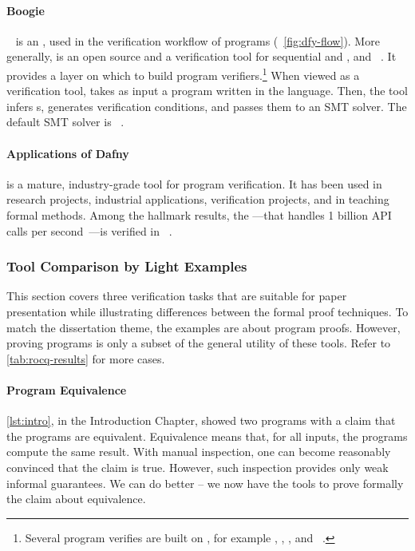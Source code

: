 \paragraph*{Boogie}
~\cite{leino2008} is an ,
used in the verification workflow of  programs
(\cf~\autoref{fig:dfy-flow}). More generally,  is an open source
 and a verification tool for sequential and
, and ~\cite{boogie}. It
provides a layer on which to build program verifiers.\footnote{Several program
verifies are built on , for example , ,
, and ~\cite{boogie}.} When viewed as a verification
tool,  takes as input a program written in the 
language. Then, the tool infers s, generates verification
conditions, and passes them to an SMT solver. The default SMT solver is
~\cite{demoura2008}.

\paragraph*{Applications of Dafny}
 is a mature, industry-grade tool for program verification. It has
been used in research projects, industrial applications, verification projects,
and in teaching formal methods. Among the hallmark results, the ---that handles 1 billion API calls per
second~\cite{wagner2024}---is verified in ~\cite{chakarov2025}.

\subsubsection{Tool Comparison by Light Examples}
\label{subsubsec:sm-tool-examples}

This section covers three verification tasks that are suitable for paper
presentation while illustrating differences between the formal proof techniques.
To match the dissertation theme, the examples are about program proofs. However,
proving programs is only a subset of the general utility of these tools. Refer
to \autoref{tab:rocq-results} for more cases.

\paragraph*{Program Equivalence}

\autoref{lst:intro}, in the Introduction Chapter, showed two programs with a
claim that the programs are equivalent. Equivalence means that, for all inputs,
the programs compute the same result. With manual inspection, one can become
reasonably convinced that the claim is true. However, such inspection provides
only weak informal guarantees. We can do better -- we now have the tools to
prove formally the claim about equivalence.

